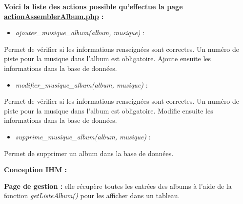 			\begin{paragraphe}
                \textbf{Voici la liste des actions possible qu'effectue la page \underline{actionAssemblerAlbum.php} :}
            
                \begin{itemize}
                    \item \emph{ajouter\_musique\_album(album, musique)} :
                \end{itemize}
                \begin{paragraphe}
                    Permet de vérifier si les informations renseignées sont correctes. Un numéro de piste pour la musique dans l'album est obligatoire. Ajoute ensuite les informations dans la base de données.
                \end{paragraphe}
                
                \begin{itemize}
                    \item \emph{modifier\_musique\_album(album, musique)} :
                \end{itemize}
                \begin{paragraphe}
                    Permet de vérifier si les informations renseignées sont correctes. Un numéro de piste pour la musique dans l'album est obligatoire. Modifie ensuite les informations dans la base de données.
                \end{paragraphe}
                
                \begin{itemize}
                    \item \emph{supprime\_musique\_album(album, musique)} :
                \end{itemize}
                \begin{paragraphe}
                    Permet de supprimer un album dans la base de données.
                \end{paragraphe}
            \end{paragraphe}

			\begin{paragraphe}
				\textbf{Conception IHM :}
			\end{paragraphe}
            
            \begin{paragraphe}
                \textbf{Page de gestion :} elle récupère toutes les entrées des albums à l'aide de la fonction \emph{getListeAlbum()} pour les afficher dans un tableau.
            \end{paragraphe}

